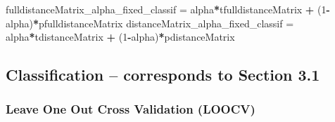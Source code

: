 \documentclass[
]{article}
\newenvironment{Shaded}{\begin{snugshade}}{\end{snugshade}}
\newcommand{\DecValTok}[1]{\textcolor[rgb]{0.00,0.00,0.81}{#1}}
\newcommand{\NormalTok}[1]{#1}
\newcommand{\OtherTok}[1]{\textcolor[rgb]{0.56,0.35,0.01}{#1}}
\newcommand{\SpecialCharTok}[1]{\textcolor[rgb]{0.81,0.36,0.00}{\textbf{#1}}}
\begin{document}
\begin{Shaded}
\begin{Highlighting}[]
\NormalTok{fulldistanceMatrix\_alpha\_fixed\_classif }\OtherTok{=}\NormalTok{ alpha}\SpecialCharTok{*}\NormalTok{tfulldistanceMatrix }\SpecialCharTok{+}\NormalTok{ (}\DecValTok{1}\SpecialCharTok{{-}}\NormalTok{alpha)}\SpecialCharTok{*}\NormalTok{pfulldistanceMatrix}
\NormalTok{distanceMatrix\_alpha\_fixed\_classif }\OtherTok{=}\NormalTok{ alpha}\SpecialCharTok{*}\NormalTok{tdistanceMatrix }\SpecialCharTok{+}\NormalTok{ (}\DecValTok{1}\SpecialCharTok{{-}}\NormalTok{alpha)}\SpecialCharTok{*}\NormalTok{pdistanceMatrix}
\end{Highlighting}
\end{Shaded}

\subsection{Classification -- corresponds to Section
3.1}\label{classification-corresponds-to-section-3.1}

\subsubsection{Leave One Out Cross Validation
(LOOCV)}\label{leave-one-out-cross-validation-loocv}
\end{document}
